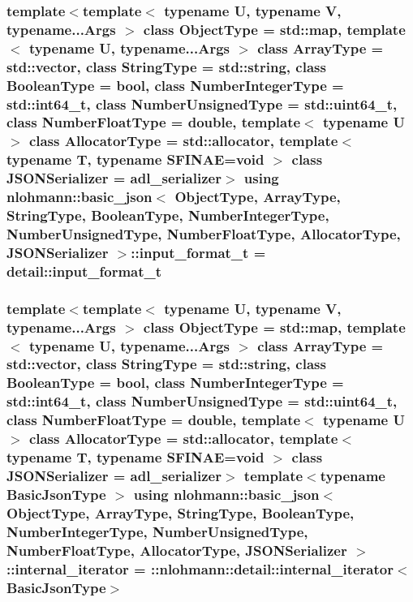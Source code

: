 \subsubsection[{\texorpdfstring{input\+\_\+format\+\_\+t}{input_format_t}}]{\setlength{\rightskip}{0pt plus 5cm}template$<$template$<$ typename U, typename V, typename...\+Args $>$ class Object\+Type = std\+::map, template$<$ typename U, typename...\+Args $>$ class Array\+Type = std\+::vector, class String\+Type  = std\+::string, class Boolean\+Type  = bool, class Number\+Integer\+Type  = std\+::int64\+\_\+t, class Number\+Unsigned\+Type  = std\+::uint64\+\_\+t, class Number\+Float\+Type  = double, template$<$ typename U $>$ class Allocator\+Type = std\+::allocator, template$<$ typename T, typename S\+F\+I\+N\+A\+E=void $>$ class J\+S\+O\+N\+Serializer = adl\+\_\+serializer$>$ using {\bf nlohmann\+::basic\+\_\+json}$<$ Object\+Type, Array\+Type, String\+Type, Boolean\+Type, Number\+Integer\+Type, Number\+Unsigned\+Type, Number\+Float\+Type, Allocator\+Type, J\+S\+O\+N\+Serializer $>$\+::{\bf input\+\_\+format\+\_\+t} =  {\bf detail\+::input\+\_\+format\+\_\+t}}\hypertarget{classnlohmann_1_1basic__json_a2ddbac818a4c84a7377b1bbd25363588}{}\label{classnlohmann_1_1basic__json_a2ddbac818a4c84a7377b1bbd25363588}
\subsubsection[{\texorpdfstring{internal\+\_\+iterator}{internal_iterator}}]{\setlength{\rightskip}{0pt plus 5cm}template$<$template$<$ typename U, typename V, typename...\+Args $>$ class Object\+Type = std\+::map, template$<$ typename U, typename...\+Args $>$ class Array\+Type = std\+::vector, class String\+Type  = std\+::string, class Boolean\+Type  = bool, class Number\+Integer\+Type  = std\+::int64\+\_\+t, class Number\+Unsigned\+Type  = std\+::uint64\+\_\+t, class Number\+Float\+Type  = double, template$<$ typename U $>$ class Allocator\+Type = std\+::allocator, template$<$ typename T, typename S\+F\+I\+N\+A\+E=void $>$ class J\+S\+O\+N\+Serializer = adl\+\_\+serializer$>$ template$<$typename Basic\+Json\+Type $>$ using {\bf nlohmann\+::basic\+\_\+json}$<$ Object\+Type, Array\+Type, String\+Type, Boolean\+Type, Number\+Integer\+Type, Number\+Unsigned\+Type, Number\+Float\+Type, Allocator\+Type, J\+S\+O\+N\+Serializer $>$\+::{\bf internal\+\_\+iterator} =  \+::{\bf nlohmann\+::detail\+::internal\+\_\+iterator}$<$Basic\+Json\+Type$>$\hspace{0.3cm}{\ttfamily [private]}}\hypertarget{classnlohmann_1_1basic__json_a3ce72c6254981a9d378ece3c9b15e96b}{}\label{classnlohmann_1_1basic__json_a3ce72c6254981a9d378ece3c9b15e96b}
